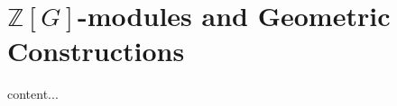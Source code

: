 \documentclass{beamer}
\begin{document}
\begin{frame}
\tableofcontents
\end{frame}

\section[{$\mathbb{Z}[G]$-module constructions}]{$\mathbb{Z}[G]$-modules and Geometric Constructions}


\begin{frame}
content...
\end{frame}
\end{document}
